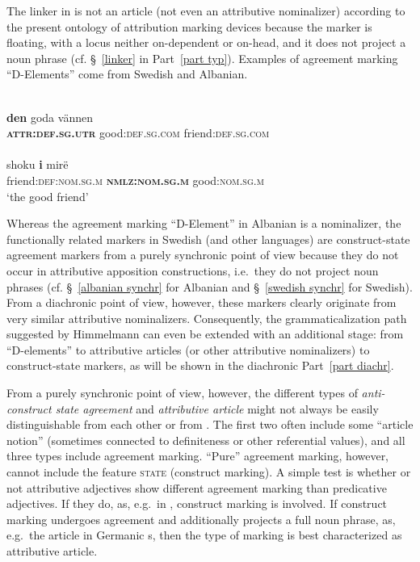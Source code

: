The linker in  is not an article (not even an attributive nominalizer) according to the present ontology of attribution marking devices because the marker is floating, with a locus neither on-dependent or on-head, and it does not project a noun phrase (cf. \S~\ref{linker} in Part~\ref{part typ}). Examples of agreement marking “D-Elements” come from Swedish and Albanian.
\begin{exe}
\ex
\begin{xlist}
\ex 
{}\\
\gll	\textbf{den} goda vännen\\
	\textbf{\textsc{attr:def.sg.utr}} good:\textsc{def.sg.com} friend:\textsc{def.sg.com}\\
\ex 
{}\\
\gll	shoku \textbf{i} mirë\\
	friend:\textsc{def:nom.sg.m} \textbf{\textsc{nmlz:nom.sg.m}} good:\textsc{nom.sg.m}\\
\glt	‘the good friend’
\end{xlist}
\end{exe}
Whereas the agreement marking “D-Element” in Albanian is a nominalizer, the functionally related markers in Swedish (and other languages) are construct-state agreement markers from a purely synchronic point of view because they do not occur in attributive apposition constructions, i.e.~they do not project noun phrases (cf. \S~\ref{albanian synchr} for Albanian and \S~\ref{swedish synchr} for Swedish). From a diachronic point of view, however, these markers clearly originate from very similar attributive nominalizers. Consequently, the grammaticalization path suggested by Himmelmann \citeyear{himmelmann1997} can even be extended with an additional stage: from “D-elements” to attributive articles (or other attributive nominalizers) to construct-state markers, as will be shown in the diachronic Part~\ref{part diachr}.

From a purely synchronic point of view, however, the different types of \emph{anti\hyp{}construct state agreement} and \emph{attributive article} might not always be easily distinguishable from each other or from \emph{}. The first two often include some “article notion” (sometimes connected to definiteness or other referential values), and all three types include agreement marking. “Pure” agreement marking, however, cannot include the feature \textsc{state} (construct marking). A simple test is whether or not attributive adjectives show different agreement marking than predicative adjectives. If they do, as, e.g.~in , construct marking is involved. If construct marking undergoes agreement and additionally projects a full noun phrase, as, e.g.~the article in Germanic s, then the type of marking is best characterized as attributive article.

